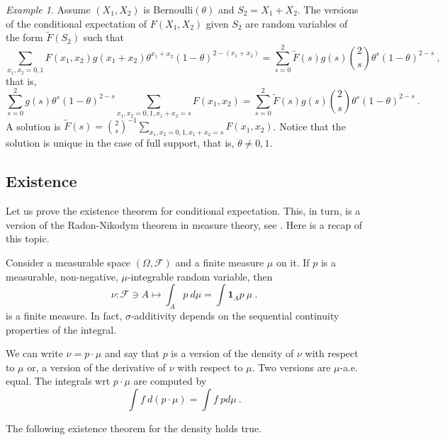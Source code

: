 \documentclass[12pt,a4paper]{amsart}
\newcommand{\one}{\bm 1}
\theoremstyle{plain}%
\theoremstyle{definition}
\theoremstyle{remark}
\newtheorem{example}{Example}
\begin{document}
\begin{example}
Assume $(X_1,X_2)$ is Bernoulli$(\theta)$ and $S_2=X_1+X_2$. The
versions of the conditional expectation of $F(X_1,X_2)$ given $S_2$
are random variables of the form $\widetilde F(S_2)$ such that
\begin{equation*}
  \sum_{x_1,x_2 = 0,1} F(x_1,x_2) g(x_1+x_2) \theta^{x_1+x_2}
  (1-\theta)^{2 - (x_1 + x_2)} = \sum_{s=0}^2 \widetilde F(s) g(s)
  \binom 2 s \theta^s (1-\theta)^{2-s} \ ,
\end{equation*}
that is,
\begin{equation*}
 \sum_{s=0}^2 g(s) \theta^{s}
  (1-\theta)^{2 - s} \sum_{x_1,x_2 = 0,1, x_1+x_2 = s} F(x_1,x_2)  = \sum_{s=0}^2 \widetilde F(s) g(s)
  \binom 2 s \theta^s (1-\theta)^{2-s} \ .
\end{equation*}
A solution is $\widetilde F(s) = \binom 2 s ^{-1} \sum_{x_1,x_2 = 0,1,
  x_1+x_2 = s} F(x_1,x_2)$. Notice that the solution is unique in the case of full support, that is, $\theta \neq 0,1$.  
\end{example}

\subsection{Existence}
\label{sec:exists}

Let us prove the existence theorem for conditional expectation. This,
in turn, is a version of the Radon-Nikodym theorem in measure theory,
see \cite[Ch.~6]{rudin:1987-3rd}. Here is a recap of this topic.

Consider a measurable space $(\Omega,\mathcal F)$ and a finite measure
$\mu$ on it. If $p$ is a measurable, non-negative, $\mu$-integrable
random variable, then
\begin{equation*}
  \nu \colon \mathcal F \ni A \mapsto \int_A p \ d\mu = \int \one_Ap \
  \mu \ .
\end{equation*}
is a finite measure. In fact, $\sigma$-additivity depends on the
sequential continuity properties of the integral.

We can write $\nu = p \cdot \mu$ and say that $p$ is a version of the
density of $\nu$ with respect to $\mu$ or, a version of the derivative
of $\nu$ with respect to $\mu$. Two versions are $\mu$-a.e. equal. The
integrals wrt $p \cdot \mu$ are computed by
\begin{equation*}
  \int f \ d(p \cdot \mu) = \int f \ pd\mu \ .
\end{equation*}

The following existence theorem for the density holds true.
\end{document}
